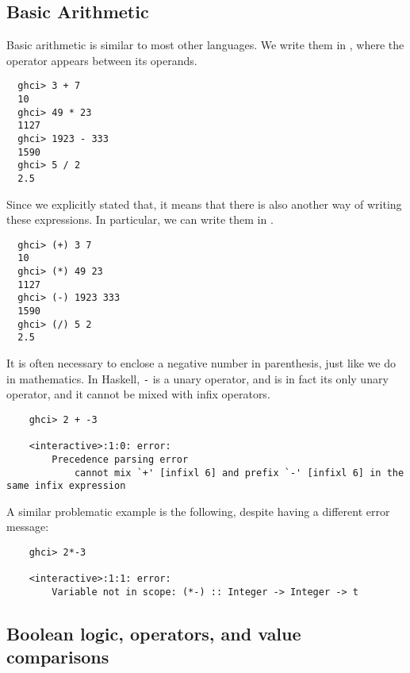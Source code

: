 \documentclass[notoc,notitlepage]{tufte-book}
\begin{document}
\subsection{Basic Arithmetic}%
\label{sub:basic_arithmetic}

Basic arithmetic is similar to most other languages. We write them in , where the operator appears between its operands.

\begin{lstlisting}
  ghci> 3 + 7
  10
  ghci> 49 * 23
  1127
  ghci> 1923 - 333
  1590
  ghci> 5 / 2
  2.5
\end{lstlisting}

Since we explicitly stated that, it means that there is also another way of writing these expressions. In particular, we can write them in .

\begin{lstlisting}
  ghci> (+) 3 7
  10 
  ghci> (*) 49 23
  1127
  ghci> (-) 1923 333
  1590
  ghci> (/) 5 2
  2.5
\end{lstlisting}

\begin{warning}
  It is often necessary to enclose a negative number in parenthesis, just like we do in mathematics. In Haskell, \texttt{-} is a unary operator, and is in fact its only unary operator, and it cannot be mixed with infix operators.
  \begin{lstlisting}
    ghci> 2 + -3

    <interactive>:1:0: error:
        Precedence parsing error
            cannot mix `+' [infixl 6] and prefix `-' [infixl 6] in the same infix expression
  \end{lstlisting}
  A similar problematic example is the following, despite having a different error message:
  \begin{lstlisting}
    ghci> 2*-3

    <interactive>:1:1: error:
        Variable not in scope: (*-) :: Integer -> Integer -> t
  \end{lstlisting}
\end{warning}


\subsection{Boolean logic, operators, and value comparisons}%
\label{sub:boolean_logic_operators_and_value_comparisons}
\end{document}
